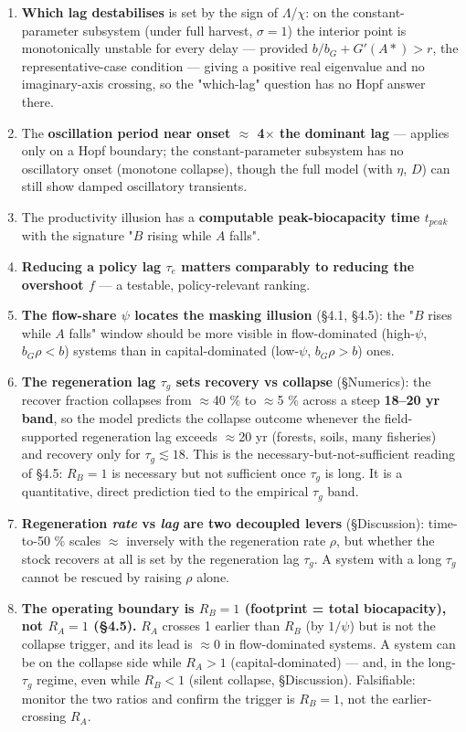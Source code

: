 \documentclass[11pt]{article}
\begin{document}
\begin{enumerate}
\item \textbf{Which lag destabilises} is set by the sign of $\Lambda{}$/$\chi{}$: on the constant-parameter subsystem (under full harvest, $\sigma{} = 1$) the interior point is monotonically unstable for every delay — provided $b/b_{G} + G\prime{}(A*) > r$, the representative-case condition — giving a positive real eigenvalue and no imaginary-axis crossing, so the "which-lag" question has no Hopf answer there.
\item The \textbf{oscillation period near onset \ensuremath{\approx{}} 4\ensuremath{\times{}} the dominant lag} — applies only on a Hopf boundary; the constant-parameter subsystem has no oscillatory onset (monotone collapse), though the full model (with $\eta{}$, $D$) can still show damped oscillatory transients.
\item The productivity illusion has a \textbf{computable peak-biocapacity time $t_{peak}$} with the signature "$B$ rising while $A$ falls".
\item \textbf{Reducing a policy lag $\tau{}_{e}$ matters comparably to reducing the overshoot $f$} — a testable, policy-relevant ranking.
\item \textbf{The flow-share $\psi{}$ locates the masking illusion} (§4.1, §4.5): the "$B$ rises while $A$ falls" window should be more visible in flow-dominated (high-$\psi{}$, $b_{G}\rho{} < b$) systems than in capital-dominated (low-$\psi{}$, $b_{G}\rho{} > b$) ones.
\item \textbf{The regeneration lag $\tau{}_{g}$ sets recovery vs collapse} (§Numerics): the recover fraction collapses from \ensuremath{\approx{}}40 \% to \ensuremath{\approx{}}5 \% across a steep \textbf{18–20 yr band}, so the model predicts the collapse outcome whenever the field-supported regeneration lag exceeds \ensuremath{\approx{}}20 yr (forests, soils, many fisheries) and recovery only for $\tau{}_{g} \lesssim{} 18$. This is the necessary-but-not-sufficient reading of §4.5: $R_{B} = 1$ is necessary but not sufficient once $\tau{}_{g}$ is long. It is a quantitative, direct prediction tied to the empirical $\tau{}_{g}$ band.
\item \textbf{Regeneration \emph{rate} vs \emph{lag} are two decoupled levers} (§Discussion): time-to-50 \% scales \ensuremath{\approx{}} inversely with the regeneration rate $\rho{}$, but whether the stock recovers at all is set by the regeneration lag $\tau{}_{g}$. A system with a long $\tau{}_{g}$ cannot be rescued by raising $\rho{}$ alone.
\item \textbf{The operating boundary is $R_{B} = 1$ (footprint = total biocapacity), not $R_{A} = 1$ (§4.5).} $R_{A}$ crosses 1 earlier than $R_{B}$ (by $1/\psi{}$) but is not the collapse trigger, and its lead is \ensuremath{\approx{}}0 in flow-dominated systems. A system can be on the collapse side while $R_{A} > 1$ (capital-dominated) — and, in the long-$\tau{}_{g}$ regime, even while $R_{B} < 1$ (silent collapse, §Discussion). Falsifiable: monitor the two ratios and confirm the trigger is $R_{B} = 1$, not the earlier-crossing $R_{A}$.
\end{enumerate}
\end{document}
